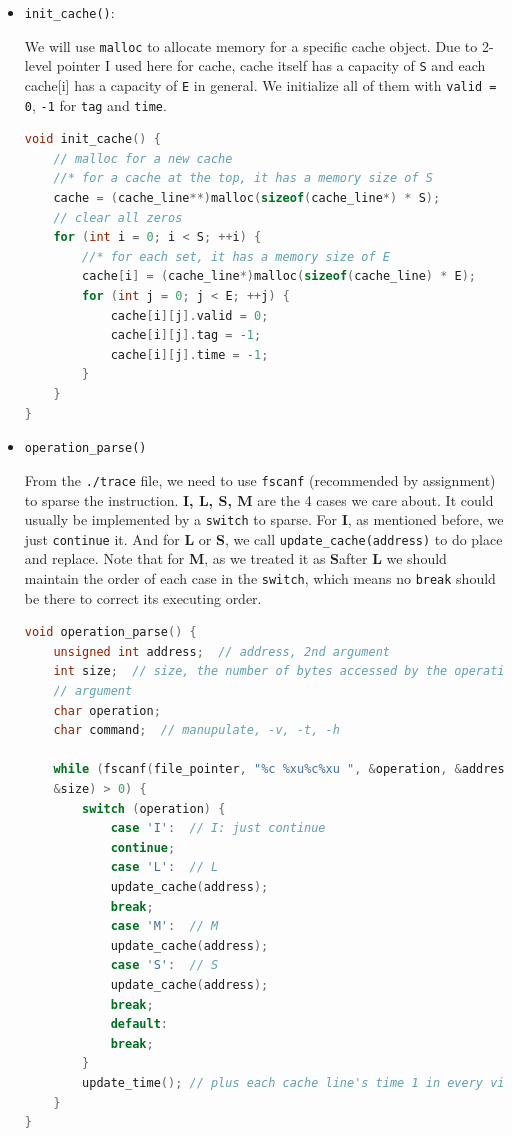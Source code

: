 \documentclass{article}
\begin{document}
\begin{itemize}
	\item \lstinline|init_cache()|:
	
	We will use \lstinline|malloc| to allocate memory for a specific cache object. Due to 2-level pointer I used here for cache, cache itself has a capacity of \lstinline|S| and each cache[i] has a capacity of \lstinline|E| in general. We initialize all of them with \lstinline|valid = 0|, \lstinline|-1| for \lstinline|tag| and \lstinline|time|.
	\begin{lstlisting}[language=c]
void init_cache() {
	// malloc for a new cache
	//* for a cache at the top, it has a memory size of S
	cache = (cache_line**)malloc(sizeof(cache_line*) * S);
	// clear all zeros
	for (int i = 0; i < S; ++i) {
		//* for each set, it has a memory size of E
		cache[i] = (cache_line*)malloc(sizeof(cache_line) * E);
		for (int j = 0; j < E; ++j) {
			cache[i][j].valid = 0;
			cache[i][j].tag = -1;
			cache[i][j].time = -1;
		}
	}
}
	\end{lstlisting}

\item \lstinline|operation_parse()|

From the \lstinline|./trace| file, we need to use \lstinline|fscanf| (recommended by assignment) to sparse the instruction. \textbf{I, L, S, M} are the 4 cases we care about. It could usually be implemented by a \lstinline|switch| to sparse. For \textbf{I}, as mentioned before, we just \lstinline|continue| it. And for \textbf{L} or \textbf{S}, we call \lstinline|update_cache(address)| to do place and replace. Note that for \textbf{M}, as we treated it as \textbf{S}after \textbf{L} we should maintain the order of each case in the \lstinline|switch|, which means no \lstinline|break| should be there to correct its executing order.~\cite{lecture}
\begin{lstlisting}[language=c]
void operation_parse() {
	unsigned int address;  // address, 2nd argument
	int size;  // size, the number of bytes accessed by the operation, 3rd
	// argument
	char operation;
	char command;  // manupulate, -v, -t, -h
	
	while (fscanf(file_pointer, "%c %xu%c%xu ", &operation, &address, &command,
	&size) > 0) {
		switch (operation) {
			case 'I':  // I: just continue
			continue;
			case 'L':  // L
			update_cache(address);
			break;
			case 'M':  // M
			update_cache(address);
			case 'S':  // S
			update_cache(address);
			break;
			default:
			break;
		}
		update_time(); // plus each cache line's time 1 in every visit
	}
}
\end{lstlisting}


\end{itemize}
\end{document}
